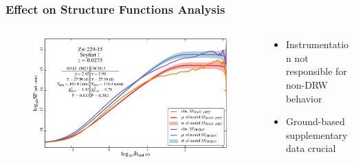 \documentclass[hyperref={pdfpagelabels=false}]{beamer}
\begin{document}
\begin{frame}
\frametitle{Effect on Structure Functions Analysis}
  \begin{columns}
    \begin{column}{0.65\textwidth}
      \begin{figure}
        \includegraphics[scale=0.2]{images/p2fig3.jpg}
      \end{figure}
    \end{column}
    \begin{column}{0.35\textwidth}
      \begin{itemize}
        \item Instrumentation not responsible for non-DRW behavior
        \item Ground-based supplementary data crucial
      \end{itemize}
      {\tiny \citet{Kasliwal15b}}
    \end{column}
  \end{columns}
\end{frame}
\end{document}
